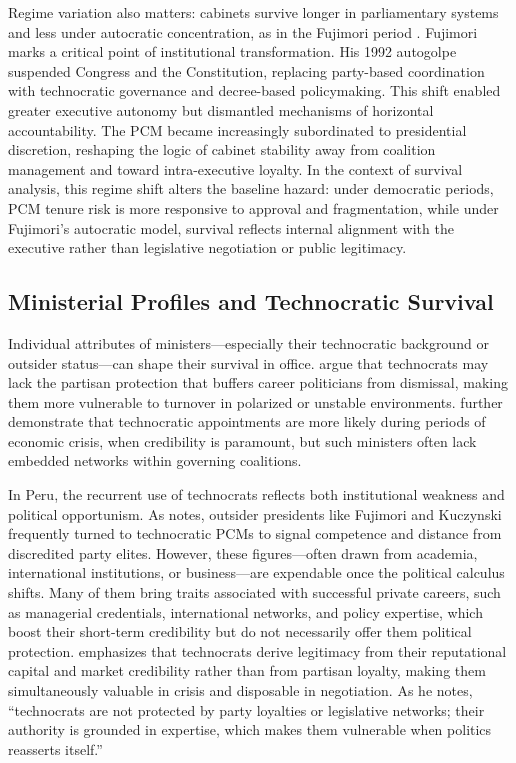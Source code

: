 \documentclass[a4paper, 12pt]{article}
\begin{document}
Regime variation also matters: cabinets survive longer in parliamentary systems and less under autocratic concentration, as in the Fujimori period \citep{perez-linan_presidential_2007, garcia_marin_fragmentacion_2024}. Fujimori marks a critical point of institutional transformation. His 1992 autogolpe suspended Congress and the Constitution, replacing party-based coordination with technocratic governance and decree-based policymaking. This shift enabled greater executive autonomy but dismantled mechanisms of horizontal accountability. The PCM became increasingly subordinated to presidential discretion, reshaping the logic of cabinet stability away from coalition management and toward intra-executive loyalty. In the context of survival analysis, this regime shift alters the baseline hazard: under democratic periods, PCM tenure risk is more responsive to approval and fragmentation, while under Fujimori's autocratic model, survival reflects internal alignment with the executive rather than legislative negotiation or public legitimacy.


\subsection{Ministerial Profiles and Technocratic Survival}

Individual attributes of ministers—especially their technocratic background or outsider status—can shape their survival in office. \citet{escobar-lemmon_coming_2010} argue that technocrats may lack the partisan protection that buffers career politicians from dismissal, making them more vulnerable to turnover in polarized or unstable environments. \citet{alexiadou_commitment_2019} further demonstrate that technocratic appointments are more likely during periods of economic crisis, when credibility is paramount, but such ministers often lack embedded networks within governing coalitions.

In Peru, the recurrent use of technocrats reflects both institutional weakness and political opportunism. As \citet{carreras_presidentes_2013} notes, outsider presidents like Fujimori and Kuczynski frequently turned to technocratic PCMs to signal competence and distance from discredited party elites. However, these figures—often drawn from academia, international institutions, or business—are expendable once the political calculus shifts. Many of them bring traits associated with successful private careers, such as managerial credentials, international networks, and policy expertise, which boost their short-term credibility but do not necessarily offer them political protection. \citet[pp.~45--48]{dargent_technocracy_2014} emphasizes that technocrats derive legitimacy from their reputational capital and market credibility rather than from partisan loyalty, making them simultaneously valuable in crisis and disposable in negotiation. As he notes, ``technocrats are not protected by party loyalties or legislative networks; their authority is grounded in expertise, which makes them vulnerable when politics reasserts itself.''
\end{document}
